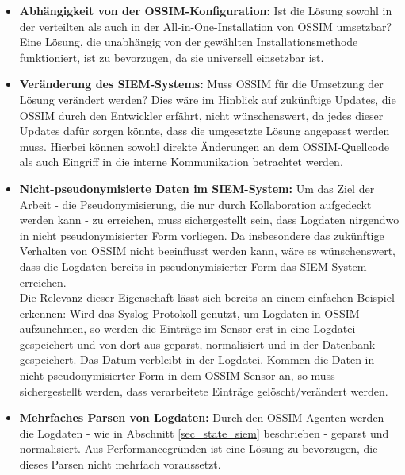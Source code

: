 \begin{itemize}

  \item \textbf{Abhängigkeit von der OSSIM-Konfiguration: } Ist die Lösung sowohl in der verteilten als auch in der All-in-One-Installation von OSSIM umsetzbar? Eine Lösung, die unabhängig von der gewählten Installationsmethode funktioniert, ist zu bevorzugen, da sie universell einsetzbar ist.
  
  \item \textbf{Veränderung des SIEM-Systems: } Muss OSSIM für die Umsetzung der Lösung verändert werden? Dies wäre im Hinblick auf zukünftige Updates, die OSSIM durch den Entwickler erfährt, nicht wünschenswert, da jedes dieser Updates dafür sorgen könnte, dass die umgesetzte Lösung angepasst werden muss. Hierbei können sowohl direkte Änderungen an dem OSSIM-Quellcode als auch Eingriff in die interne Kommunikation betrachtet werden.  
  
  \item \textbf{Nicht-pseudonymisierte Daten im SIEM-System: } Um das Ziel der Arbeit - die Pseudonymisierung, die nur durch Kollaboration aufgedeckt werden kann - zu erreichen, muss sichergestellt sein, dass Logdaten nirgendwo in nicht pseudonymisierter Form vorliegen. Da insbesondere das zukünftige Verhalten von OSSIM nicht beeinflusst werden kann, wäre es wünschenswert, dass die Logdaten bereits in pseudonymisierter Form das SIEM-System erreichen.\\
  Die Relevanz dieser Eigenschaft lässt sich bereits an einem einfachen Beispiel erkennen: Wird das Syslog-Protokoll genutzt, um Logdaten in OSSIM aufzunehmen, so werden die Einträge im Sensor erst in eine Logdatei gespeichert und von dort aus geparst, normalisiert und in der Datenbank gespeichert. Das Datum verbleibt in der Logdatei. Kommen die Daten in nicht-pseudonymisierter Form in dem OSSIM-Sensor an, so muss sichergestellt werden, dass verarbeitete Einträge gelöscht/verändert werden.
  
  \item \textbf{Mehrfaches Parsen von Logdaten: } Durch den OSSIM-Agenten werden die Logdaten - wie in Abschnitt \ref{sec_state_siem} beschrieben - geparst und normalisiert. Aus Performancegründen ist eine Lösung zu bevorzugen, die dieses Parsen nicht mehrfach voraussetzt.
  

\end{itemize}

